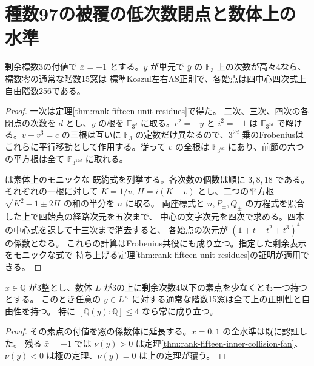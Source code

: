 \section{種数97の被覆の低次数閉点と数体上の水準}
\label{sec:rank-fifteen-negative-unit-levels}
\begin{theorem}\label{thm:rank-fifteen-negative-unit-levels}
剰余標数3の付値で $\bar x=-1$ とする。$y$ が単元で $\bar y$ の
$\mathbb F_3$ 上の次数が高々4なら、標数零の通常な階数15窓は
標準Koszul左右AS正則で、各始点は四中心四次式上自由階数256である。
\end{theorem}
\begin{proof}
一次は定理\ref{thm:rank-fifteen-unit-residues}で得た。
二次、三次、四次の各閉点の次数を $d$ とし、$\bar y$ の根を
$\mathbb F_{3^d}$ に取る。$c^2=-\bar y$ と $i^2=-1$ は
$\mathbb F_{3^{2d}}$ で解ける。$v-v^3=c$ の三根は互いに
$\mathbb F_3$ の定数だけ異なるので、$3^{2d}$ 乗のFrobeniusは
これらに平行移動として作用する。従って $v$ の全根は
$\mathbb F_{3^{6d}}$ にあり、前節の六つの平方根は全て
$\mathbb F_{3^{12d}}$ に取れる。

 は素体上のモニックな
既約式を列挙する。各次数の個数は順に $3,8,18$ である。それぞれの一根に対して
$K=1/v$, $H=i(K-v)$ とし、二つの平方根 $\sqrt{K^2-1\pm2H}$ の和の半分を $n$ に取る。
両座標式と $n,P_\pm,Q_\pm$ の方程式を照合した上で四始点の経路次元を五次まで、
中心の文字次元を四次で求める。四本の中心式を課して十三次まで消去すると、
各始点の次元が $(1+t+t^2+t^3)^4$ の係数となる。
これらの計算はFrobenius共役にも成り立つ。指定した剰余表示をモニックな式で
持ち上げる定理\ref{thm:rank-fifteen-unit-residues}の証明が適用できる。
\end{proof}

\begin{corollary}
$x\in\mathbb Q$ が3整とし、数体 $L$ が3の上に剰余次数4以下の素点を少なくとも一つ持つとする。
このとき任意の $y\in L^\times$ に対する通常な階数15窓は全て上の正則性と自由性を持つ。
特に $[\mathbb Q(y):\mathbb Q]\le4$ なら常に成り立つ。
\end{corollary}
\begin{proof}
その素点の付値を窓の係数体に延長する。$\bar x=0,1$ の全水準は既に認証した。
残る $\bar x=-1$ では $\nu(y)>0$ は定理\ref{thm:rank-fifteen-inner-collision-fan}、
$\nu(y)<0$ は極の定理、$\nu(y)=0$ は上の定理が覆う。
\end{proof}

